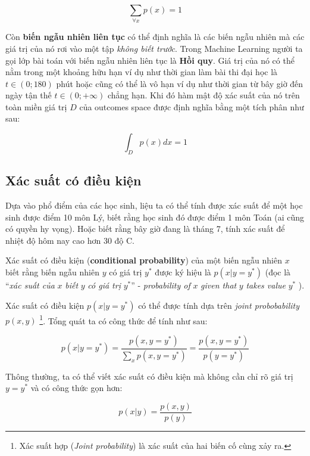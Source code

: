 \documentclass[../main-report.tex]{subfiles}
\begin{document}
\begin{equation}
\sum_{\forall x}{p(x)}=1 
\end{equation}

Còn \textbf{biến ngẫu nhiên liên tục} có thể định nghĩa là các biến ngẫu nhiên mà các giá trị của nó rơi vào một tập \textit{không biết trước}. Trong Machine Learning người ta gọi lớp bài toán với biến ngẫu nhiên liên tục là \textbf{Hồi quy}. Giá trị của nó có thể nằm trong một khoảng hữu hạn ví dụ như thời gian làm bài thi đại học là $t \in \left ( 0;180 \right )$ phút hoặc cũng có thể là vô hạn ví dụ như thời gian từ bây giờ đến ngày tận thế $t \in \left ( 0; +\infty \right )$ chẳng hạn. Khi đó hàm mật độ xác suất của nó trên toàn miền giá trị $D$ của outcomes space được định nghĩa bằng một tích phân như sau:

\begin{equation}
\int_{D}p(x)dx=1
\end{equation}

\subsection{Xác suất có điều kiện}
Dựa vào phổ điểm của các học sinh, liệu ta có thể tính được xác suất để một học sinh được điểm 10 môn Lý, biết rằng học sinh đó được điểm 1 môn Toán (ai cũng có quyền hy vọng). Hoặc biết rằng bây giờ đang là tháng 7, tính xác suất để nhiệt độ hôm nay cao hơn 30 độ C.

Xác suất có điều kiện (\textbf{conditional probability}) của một biến ngẫu nhiên $x$ biết rằng biến ngẫu nhiên $y$ có giá trị $y^{*}$ được ký hiệu là $p(x | y = y^{*})$ (đọc là ``\textit{xác suất của} $x$ \textit{biết} $y$ \textit{có giá trị} $y^{*}$'' - \textit{probability of} $x$ \textit{given that} $y$ \textit{takes value} $y^{*}$ ).

Xác suất có điều kiện \(p(x | y = y^*)\) có thể được tính dựa trên \textit{joint probobability} \(p(x, y)\) \footnote{Xác suất hợp (\textit{Joint probability}) là xác suất của hai biến cố cùng xảy ra.}. Tổng quát ta có công thức để tính như sau:

\begin{equation}
  p(x | y = y^*) = \frac{p(x, y = y^*)}{\sum_{x} p(x, y = y^*)} = \frac{p(x, y = y^*)}{p(y = y^*)}
\end{equation}

Thông thường, ta có thể viết xác suất có điều kiện mà không cần chỉ rõ giá trị \(y = y^*\) và có công thức gọn hơn:

\begin{equation}
	p(x | y) = \frac{p(x, y)}{p(y)}
\end{equation}
  
\end{document}
